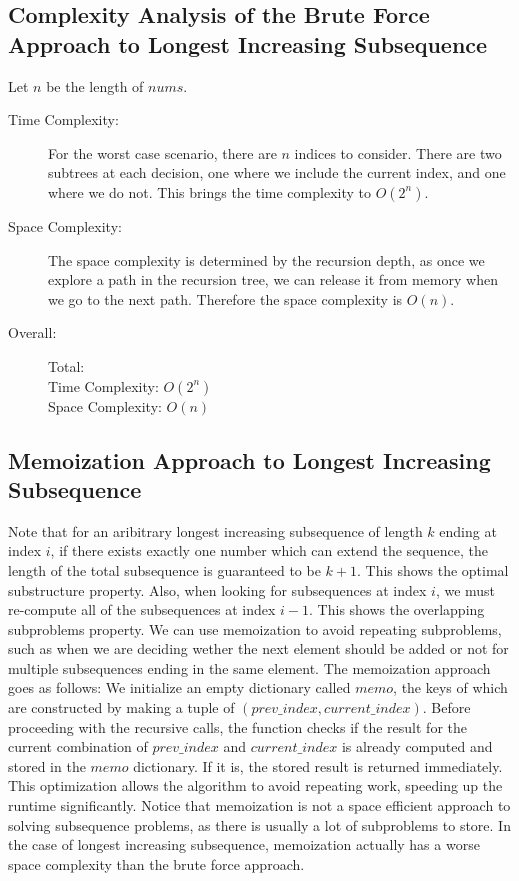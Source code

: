 \subsection{Complexity Analysis of the Brute Force Approach to Longest Increasing Subsequence}
Let $n$ be the length of $nums$.
\begin{description}
    \item[Time Complexity:]
        For the worst case scenario, there are $n$ indices to consider.
        There are two subtrees at each decision, one where we include the current index, and one where we do not.
        This brings the time complexity to $O(2^n)$.
        
    \item[Space Complexity:] 
        The space complexity is determined by the recursion depth,
        as once we explore a path in the recursion tree, we can release it from memory when we go to the next path.
        Therefore the space complexity is $O(n)$.
        
        
    \item[Overall:] Total:\\
        Time Complexity: $O(2^n)$\\
        Space Complexity: $O(n)$
        

\end{description}


\subsection{Memoization Approach to Longest Increasing Subsequence}

Note that for an aribitrary longest increasing subsequence of length $k$ ending at index $i$,
if there exists exactly one number which can extend the sequence, the length of the total subsequence is guaranteed to be $k+1$.
This shows the optimal substructure property.
Also, when looking for subsequences at index $i$,
we must re-compute all of the subsequences at index $i-1$.
This shows the overlapping subproblems property.
We can use memoization to avoid repeating subproblems, such as when we are deciding wether the next element should be added or not for multiple subsequences ending in the same element.
The memoization approach goes as follows:
We initialize an empty dictionary called $memo$,
the keys of which are constructed by making a tuple of $(prev\_index, current\_index)$.
Before proceeding with the recursive calls, the function checks if the result for the current combination of $prev\_index$ and $current\_index$ is already computed and stored in the $memo$ dictionary.
If it is, the stored result is returned immediately.
This optimization allows the algorithm to avoid repeating work,
speeding up the runtime significantly.
Notice that memoization is not a space efficient approach to solving subsequence problems, as there is usually a lot of subproblems to store. In the case of longest increasing subsequence, memoization actually has a worse space complexity than the brute force approach.


